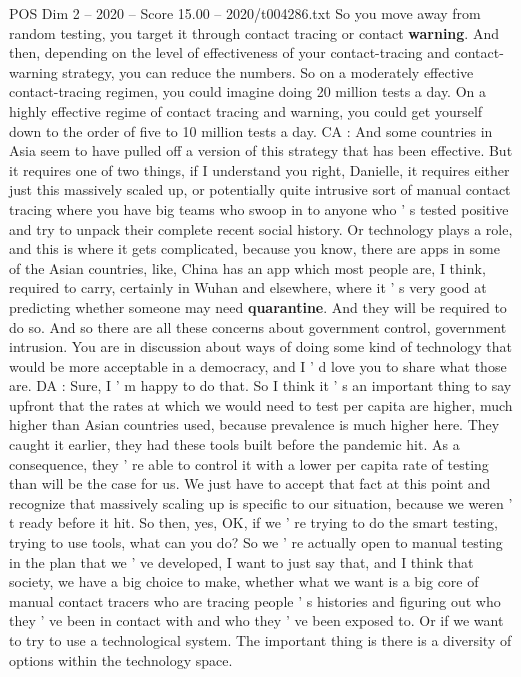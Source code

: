 \begin{textsample}{POS Dim 2 – 2020 – Score 15.00 – 2020/t004286.txt}
So you move away from random testing, you target it through contact tracing or contact \textbf{warning}.
And then, depending on the level of effectiveness of your contact-tracing and contact-warning strategy, you can reduce the numbers.
So on a moderately effective contact-tracing regimen, you could imagine doing 20 million tests a day.
On a highly effective regime of contact tracing and warning, you could get yourself down to the order of five to 10 million tests a day.
CA : And some countries in Asia seem to have pulled off a version of this strategy that has been effective.
But it requires one of two things, if I understand you right, Danielle, it requires either just this massively scaled up, or potentially quite intrusive sort of manual contact tracing where you have big teams who swoop in to anyone who ' s tested positive and try to unpack their complete recent social history.
Or technology plays a role, and this is where it gets complicated, because you know, there are apps in some of the Asian countries, like, China has an app which most people are, I think, required to carry, certainly in Wuhan and elsewhere, where it ' s very good at predicting whether someone may need \textbf{quarantine}.
And they will be required to do so.
And so there are all these concerns about government control, government intrusion.
You are in discussion about ways of doing some kind of technology that would be more acceptable in a democracy, and I ' d love you to share what those are.
DA : Sure, I ' m happy to do that.
So I think it ' s an important thing to say upfront that the rates at which we would need to test per capita are higher, much higher than Asian countries used, because prevalence is much higher here.
They caught it earlier, they had these tools built before the pandemic hit.
As a consequence, they ' re able to control it with a lower per capita rate of testing than will be the case for us.
We just have to accept that fact at this point and recognize that massively scaling up is specific to our situation, because we weren ' t ready before it hit.
So then, yes, OK, if we ' re trying to do the smart testing, trying to use tools, what can you do?
So we ' re actually open to manual testing in the plan that we ' ve developed, I want to just say that, and I think that society, we have a big choice to make, whether what we want is a big core of manual contact tracers who are tracing people ' s histories and figuring out who they ' ve been in contact with and who they ' ve been exposed to.
Or if we want to try to use a technological system.
The important thing is there is a diversity of options within the technology space.

\end{textsample}

